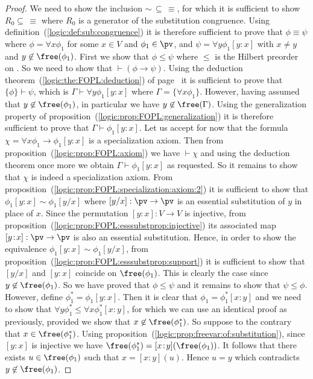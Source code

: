 \begin{proof}
We need to show the inclusion $\sim\,\subseteq\,\equiv$, for which
it is sufficient to show $R_{0}\subseteq\,\equiv$ where $R_{0}$ is a
generator of the substitution congruence. Using
definition~(\ref{logic:def:sub:congruence}) it is therefore
sufficient to prove that $\phi\equiv\psi$ where $\phi=\forall
x\phi_{1}$ for some $x\in V$ and $\phi_{1}\in\pv$, and $\psi=\forall
y\phi_{1}[y\!:\!x]$ with $x\neq y$ and $y\not\in\free(\phi_{1})$.
First we show that $\phi\leq\psi$ where $\leq$ is the Hilbert
preorder on \pv. So we need to show that $\vdash(\phi\to\psi)$.
Using the deduction theorem~(\ref{logic:the:FOPL:deduction}) of
page~\pageref{logic:the:FOPL:deduction} it is sufficient to prove
that $\{\phi\}\vdash\psi$, which is $\Gamma\vdash\forall
y\phi_{1}[y\!:\!x]$ where $\Gamma=\{\forall x\phi_{1}\}$. However,
having assumed that $y\not\in\free(\phi_{1})$, in particular we have
$y\not\in\free(\Gamma)$. Using the generalization property of
proposition~(\ref{logic:prop:FOPL:generalization}) it is therefore
sufficient to prove that $\Gamma\vdash\phi_{1}[y\!:\!x]$. Let us
accept for now that the formula $\chi=\forall
x\phi_{1}\to\phi_{1}[y\!:\!x]$ is a specialization axiom. Then from
proposition~(\ref{logic:prop:FOPL:axiom}) we have $\vdash\chi$ and
using the deduction theorem once more we obtain
$\Gamma\vdash\phi_{1}[y\!:\!x]$ as requested. So it remains to show
that $\chi$ is indeed a specialization axiom. From
proposition~(\ref{logic:prop:FOPL:specialization:axiom:2}) it is
sufficient to show that $\phi_{1}[y\!:\!x]\sim\phi_{1}[y/x]$ where
$[y/x]:\pv\to\pv$ is an essential substitution of $y$ in place of
$x$. Since the permutation $[y\!:\!x]:V\to V$ is injective, from
proposition~(\ref{logic:prop:FOPL:esssubstprop:injective}) its
associated map $[y\!:\!x]:\pv\to\pv$ is also an essential
substitution. Hence, in order to show the equivalence
$\phi_{1}[y\!:\!x]\sim\phi_{1}[y/x]$, from
proposition~(\ref{logic:prop:FOPL:esssubstprop:support}) it is
sufficient to show that $[y/x]$ and $[y\!:\!x]$ coincide on
$\free(\phi_{1})$. This is clearly the case since
$y\not\in\free(\phi_{1})$. So we have proved that $\phi\leq\psi$ and
it remains to show that $\psi\leq\phi$. However, define
$\phi_{1}^{*}=\phi_{1}[y\!:\!x]$. Then it is clear that
$\phi_{1}=\phi_{1}^{*}[x\!:\!y]$ and we need to show that $\forall
y\phi_{1}^{*}\leq\forall x \phi_{1}^{*}[x\!:\!y]$, for which we can
use an identical proof as previously, provided we show that
$x\not\in\free(\phi_{1}^{*})$. So suppose to the contrary that
$x\in\free(\phi_{1}^{*})$. Using
proposition~(\ref{logic:prop:freevar:of:substitution}), since
$[y\!:\!x]$ is injective we have
$\free(\phi_{1}^{*})=[x\!:\!y](\free(\phi_{1}))$. It follows that
there exists $u\in\free(\phi_{1})$ such that $x=[x\!:\!y](u)$. Hence
$u=y$ which contradicts $y\not\in\free(\phi_{1})$.
\end{proof}

